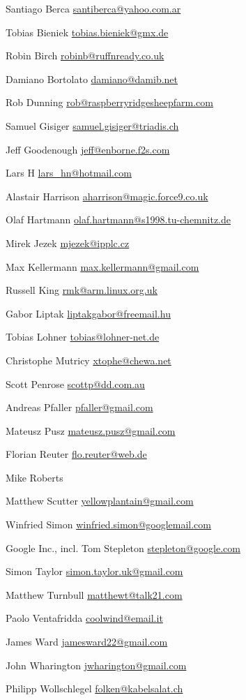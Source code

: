 \item Santiago Berca \url{santiberca@yahoo.com.ar}
\item Tobias Bieniek \url{tobias.bieniek@gmx.de}
\item Robin Birch \url{robinb@ruffnready.co.uk}
\item Damiano Bortolato \url{damiano@damib.net}
\item Rob Dunning \url{rob@raspberryridgesheepfarm.com}
\item Samuel Gisiger \url{samuel.gisiger@triadis.ch}
\item Jeff Goodenough \url{jeff@enborne.f2s.com}
\item Lars H \url{lars_hn@hotmail.com}
\item Alastair Harrison \url{aharrison@magic.force9.co.uk}
\item Olaf Hartmann \url{olaf.hartmann@s1998.tu-chemnitz.de}
\item Mirek Jezek \url{mjezek@ipplc.cz}
\item Max Kellermann \url{max.kellermann@gmail.com}
\item Russell King \url{rmk@arm.linux.org.uk}
\item Gabor Liptak \url{liptakgabor@freemail.hu}
\item Tobias Lohner \url{tobias@lohner-net.de}
\item Christophe Mutricy \url{xtophe@chewa.net}
\item Scott Penrose \url{scottp@dd.com.au}
\item Andreas Pfaller \url{pfaller@gmail.com}
\item Mateusz Pusz \url{mateusz.pusz@gmail.com}
\item Florian Reuter \url{flo.reuter@web.de}
\item Mike Roberts 
\item Matthew Scutter \url{yellowplantain@gmail.com}
\item Winfried Simon \url{winfried.simon@googlemail.com}
\item Google Inc., incl. Tom Stepleton \url{stepleton@google.com}
\item Simon Taylor \url{simon.taylor.uk@gmail.com}
\item Matthew Turnbull \url{matthewt@talk21.com}
\item Paolo Ventafridda \url{coolwind@email.it}
\item James Ward \url{jamesward22@gmail.com}
\item John Wharington \url{jwharington@gmail.com}
\item Philipp Wollschlegel \url{folken@kabelsalat.ch}
